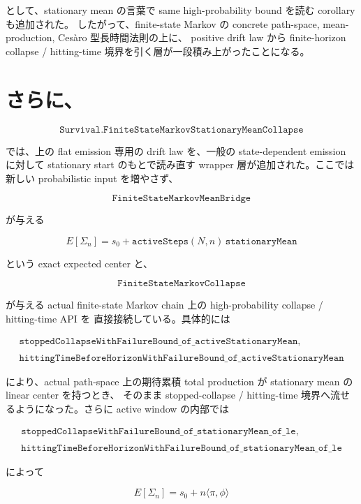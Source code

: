 \documentclass[12pt,a4paper]{article}
\begin{document}
として、stationary mean の言葉で same high-probability bound を読む corollary も追加された。 したがって、finite-state Markov の concrete path-space, mean-production, Cesàro 型長時間法則の上に、 positive drift law から finite-horizon collapse / hitting-time 境界を引く層が一段積み上がったことになる。

\section{さらに、}\label{ux3055ux3089ux306b-7}

\[
\texttt{Survival.FiniteStateMarkovStationaryMeanCollapse}
\]

では、上の flat emission 専用の drift law を、一般の state-dependent emission に対して stationary start のもとで読み直す wrapper 層が追加された。ここでは新しい probabilistic input を増やさず、

\[
\texttt{FiniteStateMarkovMeanBridge}
\]

が与える

\[
E[\Sigma_{n}] = s_0 + \texttt{activeSteps}(N,n)\,\texttt{stationaryMean}
\]

という exact expected center と、

\[
\texttt{FiniteStateMarkovCollapse}
\]

が与える actual finite-state Markov chain 上の high-probability collapse / hitting-time API を 直接接続している。具体的には

\[
\begin{aligned}
\texttt{stoppedCollapseWithFailureBound\_of\_activeStationaryMean}, \\
\qquad \\
\texttt{hittingTimeBeforeHorizonWithFailureBound\_of\_activeStationaryMean}
\end{aligned}
\]

により、actual path-space 上の期待累積 total production が stationary mean の linear center を持つとき、 そのまま stopped-collapse / hitting-time 境界へ流せるようになった。さらに active window の内部では

\[
\begin{aligned}
\texttt{stoppedCollapseWithFailureBound\_of\_stationaryMean\_of\_le}, \\
\qquad \\
\texttt{hittingTimeBeforeHorizonWithFailureBound\_of\_stationaryMean\_of\_le}
\end{aligned}
\]

によって

\[
E[\Sigma_{n}] = s_0 + n\langle \pi,\phi\rangle
\]
\end{document}
